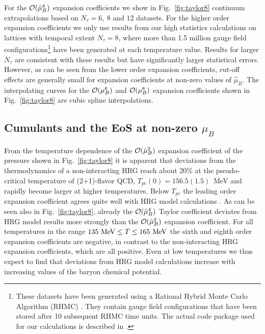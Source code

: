 \documentclass[pdflatex,prd,twocolumn,showpacs,superscriptaddress,nofootinbib]{revtex4-1}
\newcommand \hmu {\hat{\mu}}
\begin{document}
For the ${\cal O}(\hmu_B^4)$ expansion coefficients we show in Fig.~\ref{fig:taylor8} continuum extrapolations based on
$N_\tau=6,\ 8$ and $12$ datasets. For the higher
order expansion coefficients we only use results
from our high statistics calculations on lattices
with temporal extent $N_\tau=8$, where more than
1.5 million gauge field configurations\footnote{These datasets have been generated using a Rational Hybrid Monte Carlo Algorithm (RHMC) \cite{Clark:2006fx,MILC:2010pul}. They contain 
gauge field configurations that have been stored after 10 subsequent RHMC time units. 
The actual code package used for our calculations
is described in \cite{Altenkort:2021fqk}.}  have been generated at each temperature value. Results for 
larger $N_\tau$ are consistent with these results but have significantly larger statistical errors. However, as can be seen from the lower order expansion coefficients, cut-off effects are generally small for expansion coefficients at non-zero values of $\hmu_B$. 
The interpolating curves for the 
${\cal O}(\mu^6_B)$ and ${\cal O}(\mu^8_B)$
expansion coefficients shown in Fig.~\ref{fig:taylor8} are cubic spline interpolations.


\subsection{Cumulants and the EoS at non-zero \boldmath$\mu_B$}

From the temperature dependence of the 
${\cal O}(\hmu_B^2)$ expansion coefficient of the pressure shown in Fig.~\ref{fig:taylor8} it is apparent  that deviations from the thermodynamics of 
a non-interacting HRG reach about 20\% at the
pseudo-critical temperature of (2+1)-flavor QCD, $T_{pc}(0)=156.5(1.5)$~MeV \cite{HotQCD:2018pds}
and rapidly become larger at higher temperatures.
Below $T_{pc}$ the leading order expansion coefficient agrees quite well with HRG model calculations
\cite{Bollweg:2021vqf}. As can be seen also in Fig.~\ref{fig:taylor8},
already the ${\cal O}(\hmu_B^4)$ Taylor coefficient deviates from HRG model results more strongly than the ${\cal O}(\hmu_B^2)$ expansion coefficient. For all temperatures in the range
$135~{\rm MeV}\le T \le 165~{\rm MeV}$ the 
sixth and eighth order expansion coefficients are
negative, in contrast to the non-interacting HRG
expansion coefficients, which are all positive.
Even at low temperatures we thus expect to find
that deviations from HRG model calculations 
increase with increasing values of the baryon
chemical potential.
\end{document}
